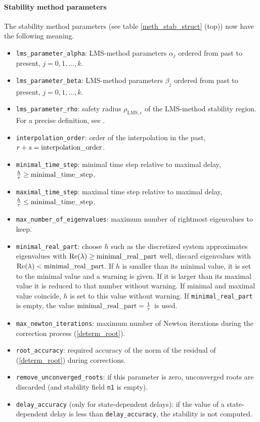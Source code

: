 \documentclass[10pt]{scrartcl}
\renewcommand{\Re}{\operatorname{Re}}
\newcommand{\blist}[1]{\mbox{\lstinline!#1!}}
\begin{document}
{\paragraph{Stability method parameters}
The stability method parameters (see table \ref{meth_stab_struct}
(top)) now have the following meaning.
\begin{itemize}
\item \blist{lms_parameter_alpha}: LMS-method parameters $\alpha_j$ 
ordered from past to present, $j=0,1,\ldots,k$.
\item \blist{lms_parameter_beta}: LMS-method parameters $\beta_j$ 
ordered from past to present, $j=0,1,\ldots,k$.
\item \blist{lms_parameter_rho}: safety radius
  $\rho_{\mathrm{LMS},\epsilon}$ of the LMS-method stability region.
  For a precise definition, see \cite[\S III.3.2]{Enge00}.
\item \blist{interpolation_order}: order of the interpolation in the
past, $r+s=\blist{interpolation_order}$.
\item \blist{minimal_time_step}: minimal time step relative to maximal
delay, $\frac{h}{\tau}\geq\blist{minimal_time_step}$.
\item \blist{maximal_time_step}: maximal time step relative to maximal
delay, $\frac{h}{\tau}\leq\blist{minimal_time_step}$. 
\item \blist{max_number_of_eigenvalues}: maximum number of rightmost
eigenvalues to keep.
\item \blist{minimal_real_part}: choose $h$ such as the discretized
  system approximates eigenvalues with $\Re(\lambda)\geq
  \blist{minimal_real_part}$ well, discard eigenvalues with
  $\Re(\lambda)<\blist{minimal_real_part}$.  If $h$ is smaller than
  its minimal value, it is set to the minimal value and a warning is
  given. If it is larger than its maximal value it is reduced to that
  number without warning.  If minimal and maximal value coincide, $h$
  is set to this value without warning.  If \blist{minimal_real_part}
  is empty, the value $\blist{minimal_real_part}=\frac{1}{\tau}$ is
  used.
\item \blist{max_newton_iterations}: maximum number of Newton
  iterations during the correction process (\ref{determ_root}).
\item \blist{root_accuracy}: required accuracy of the norm of the
  residual of (\ref{determ_root}) during corrections.
\item \blist{remove_unconverged_roots}: if this parameter is zero,
  unconverged roots are discarded (and stability field \blist{n1} is
  empty).
\item \blist{delay_accuracy} (only for state-dependent delays): if the
  value of a state-dependent delay is less than
  \blist{delay_accuracy}, the stability is not computed.
\end{itemize}

}
\end{document}
